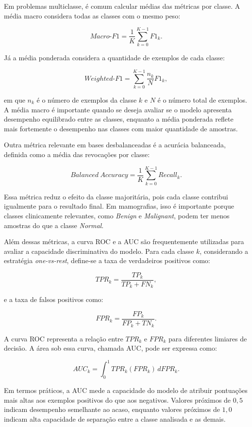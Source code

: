 \documentclass[
    12pt,
    openright,
    oneside,
    a4paper,
    english,
    brazil
]{abntex2}
\begin{document}
Em problemas multiclasse, é comum calcular médias das métricas por classe. A média macro considera todas as classes com o mesmo peso:

\[
Macro\text{-}F1 =
\frac{1}{K}
\sum_{k=0}^{K-1}
F1_k.
\]

Já a média ponderada considera a quantidade de exemplos de cada classe:

\[
Weighted\text{-}F1 =
\sum_{k=0}^{K-1}
\frac{n_k}{N}
F1_k,
\]

em que \(n_k\) é o número de exemplos da classe \(k\) e \(N\) é o número total de exemplos. A média macro é importante quando se deseja avaliar se o modelo apresenta desempenho equilibrado entre as classes, enquanto a média ponderada reflete mais fortemente o desempenho nas classes com maior quantidade de amostras.

Outra métrica relevante em bases desbalanceadas é a acurácia balanceada, definida como a média das revocações por classe:

\[
Balanced\ Accuracy =
\frac{1}{K}
\sum_{k=0}^{K-1}
Recall_k.
\]

Essa métrica reduz o efeito da classe majoritária, pois cada classe contribui igualmente para o resultado final. Em mamografias, isso é importante porque classes clinicamente relevantes, como \textit{Benign} e \textit{Malignant}, podem ter menos amostras do que a classe \textit{Normal}.

Além dessas métricas, a curva ROC e a AUC são frequentemente utilizadas para avaliar a capacidade discriminativa do modelo. Para cada classe \(k\), considerando a estratégia \textit{one-vs-rest}, define-se a taxa de verdadeiros positivos como:

\[
TPR_k =
\frac{TP_k}{TP_k + FN_k},
\]

e a taxa de falsos positivos como:

\[
FPR_k =
\frac{FP_k}{FP_k + TN_k}.
\]

A curva ROC representa a relação entre \(TPR_k\) e \(FPR_k\) para diferentes limiares de decisão. A área sob essa curva, chamada AUC, pode ser expressa como:

\[
AUC_k =
\int_{0}^{1}
TPR_k(FPR_k)\,dFPR_k.
\]

Em termos práticos, a AUC mede a capacidade do modelo de atribuir pontuações mais altas aos exemplos positivos do que aos negativos. Valores próximos de \(0{,}5\) indicam desempenho semelhante ao acaso, enquanto valores próximos de \(1{,}0\) indicam alta capacidade de separação entre a classe analisada e as demais.
\end{document}
